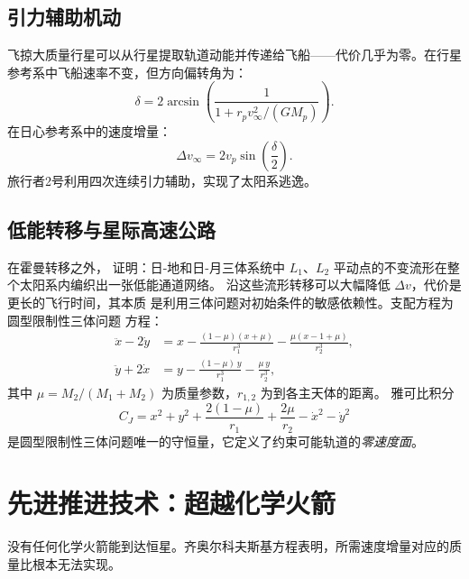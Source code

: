 \documentclass[12pt,a4paper]{article}
\begin{document}
\subsection{引力辅助机动}

飞掠大质量行星可以从行星提取轨道动能并传递给飞船——代价几乎为零。在行星参考系中飞船速率不变，但方向偏转角为：
\begin{equation}
  \delta = 2\arcsin\!\left(\frac{1}{1 + r_p v_\infty^2/(GM_p)}\right).
\end{equation}
在日心参考系中的速度增量：
\begin{equation}
  \Delta v_\infty = 2v_p\sin\!\left(\frac{\delta}{2}\right).
\end{equation}
旅行者2号利用四次连续引力辅助，实现了太阳系逃逸。

\subsection{低能转移与星际高速公路}

在霍曼转移之外，\citet{Belbruno1987} 证明：日-地和日-月三体系统中
$L_1$、$L_2$ 平动点的不变流形在整个太阳系内编织出一张低能通道网络。
沿这些流形转移可以大幅降低 $\Delta v$，代价是更长的飞行时间，其本质
是利用三体问题对初始条件的敏感依赖性。支配方程为圆型限制性三体问题
方程：
\begin{align}
  \ddot{x} - 2\dot{y} &= x - \frac{(1-\mu)(x+\mu)}{r_1^3}
    - \frac{\mu(x-1+\mu)}{r_2^3}, \label{eq:cr3bp_x_zh}\\
  \ddot{y} + 2\dot{x} &= y - \frac{(1-\mu)\,y}{r_1^3}
    - \frac{\mu\,y}{r_2^3}, \label{eq:cr3bp_y_zh}
\end{align}
其中 $\mu = M_2/(M_1+M_2)$ 为质量参数，$r_{1,2}$ 为到各主天体的距离。
雅可比积分
\begin{equation}
  C_J = x^2 + y^2 + \frac{2(1-\mu)}{r_1} + \frac{2\mu}{r_2}
        - \dot{x}^2 - \dot{y}^2
  \label{eq:jacobi_zh}
\end{equation}
是圆型限制性三体问题唯一的守恒量，它定义了约束可能轨道的\emph{零速度面}。

\section{先进推进技术：超越化学火箭}

没有任何化学火箭能到达恒星。齐奥尔科夫斯基方程表明，所需速度增量对应的质量比根本无法实现。
\end{document}

